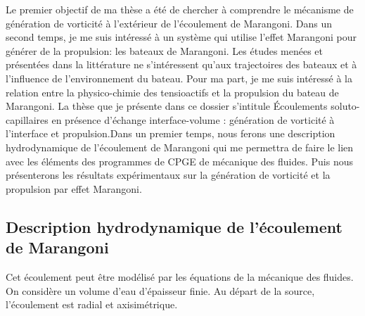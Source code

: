 \documentclass[french, 10pt]{article}
\begin{document}


\noindent
\begin{minipage}[c]{0.55\linewidth}

 Le premier objectif de ma thèse a été de chercher à comprendre le mécanisme de génération de vorticité à l'extérieur de l'écoulement de Marangoni. Dans un second temps, je me suis intéressé à un système qui utilise l'effet Marangoni pour générer de la propulsion: les bateaux de Marangoni. Les études menées et présentées dans la littérature ne s'intéressent qu'aux trajectoires des bateaux et à l'influence de l'environnement du bateau. Pour ma part, je me suis intéressé à la relation entre la physico-chimie des tensioactifs et la propulsion du bateau de Marangoni. La thèse que je présente dans ce dossier s'intitule \og{}Écoulements soluto-capillaires en présence d'échange interface-volume : génération de vorticité à l'interface et propulsion\fg{}.Dans un premier temps, nous ferons une description hydrodynamique de l'écoulement de Marangoni qui me permettra de faire le lien avec les éléments des programmes de CPGE de mécanique des fluides. Puis nous présenterons les résultats expérimentaux sur la génération de vorticité et la propulsion par effet Marangoni.


\subsection{Description hydrodynamique de l'écoulement de Marangoni}

Cet écoulement peut être modélisé par les équations de la mécanique des fluides. On considère un volume d'eau d'épaisseur finie. Au départ de la source, l'écoulement est radial et axisimétrique. 
\end{minipage}\hfill%
\end{document}
